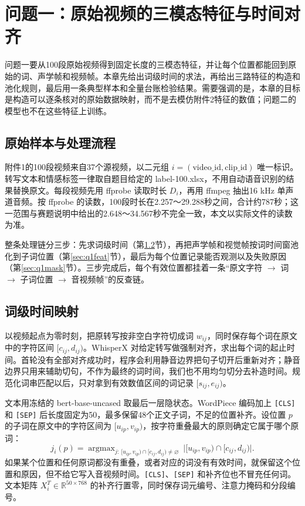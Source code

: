 \section{问题一：原始视频的三模态特征与时间对齐}\label{sec:q1}

问题一要从100段原始视频得到固定长度的三模态特征，并让每个位置都能回到原始的词、声学帧和视频帧。本章先给出词级时间的求法，再给出三路特征的构造和池化规则，最后用一条典型样本和全量台账检验结果。需要强调的是，本章的目标是构造可以逐条核对的原始数据映射，而不是去模仿附件2特征的数值；问题二的模型也不在这些特征上训练。

\subsection{原始样本与处理流程}

附件1的100段视频来自37个源视频，以二元组 $i=(\text{video\_id},\text{clip\_id})$ 唯一标识。转写文本和情感标签一律取自题目给定的 label-100.xlsx，不用自动语音识别的结果替换原文。每段视频先用 ffprobe 读取时长 $D_i$，再用 ffmpeg 抽出16 kHz 单声道音频。按 ffprobe 的读数，100段时长在2.257～29.288秒之间，合计约787秒；这一范围与赛题说明中给出的2.648～34.567秒不完全一致，本文以实际文件的读数为准。

整条处理链分三步：先求词级时间（第\ref{sec:q1time}节），再把声学帧和视觉帧按词时间窗池化到子词位置（第\ref{sec:q1feat}节），最后为每个位置记录能否观测以及失败原因（第\ref{sec:q1mask}节）。三步完成后，每个有效位置都挂着一条“原文字符 $\to$ 词 $\to$ 子词位置 $\to$ 音视频帧”的反查链。

\subsection{词级时间映射}\label{sec:q1time}

以视频起点为零时刻，把原转写按非空白字符切成词 $w_{ij}$，同时保存每个词在原文中的字符区间 $[c_{ij},d_{ij})$。WhisperX\cite{bain2023whisperx} 对给定转写做强制对齐，求出每个词的起止时间。首轮没有全部对齐成功时，程序会利用静音边界把句子切开后重新对齐；静音边界只用来辅助切句，不作为最终的词时间，我们也不用均匀切分去补造时间。规范化词串匹配以后，只对拿到有效数值区间的词记录 $[s_{ij},e_{ij})$。

文本用冻结的 bert-base-uncased 取最后一层隐状态\cite{devlin2019bert}。WordPiece 编码加上 \texttt{[CLS]} 和 \texttt{[SEP]} 后长度固定为50，最多保留48个正文子词，不足的位置补齐。设位置 $p$ 的子词在原文中的字符区间为 $[u_{ip},v_{ip})$，按字符重叠最大的原则确定它属于哪个原词：
\begin{equation}\label{eq:overlap}
j_i(p)=\mathop{\arg\max}_{j:\ [u_{ip},v_{ip})\cap[c_{ij},d_{ij})\neq\varnothing}\ \big|[u_{ip},v_{ip})\cap[c_{ij},d_{ij})\big|.
\end{equation}
如果某个位置和任何原词都没有重叠，或者对应的词没有有效时间，就保留这个位置和原因，但不给它写入音视频时间。\texttt{[CLS]}、\texttt{[SEP]} 和补齐位也不冒充任何词。文本矩阵 $X_i^T\in\mathbb{R}^{50\times768}$ 的补齐行置零，同时保存词元编号、注意力掩码和分段编号。

